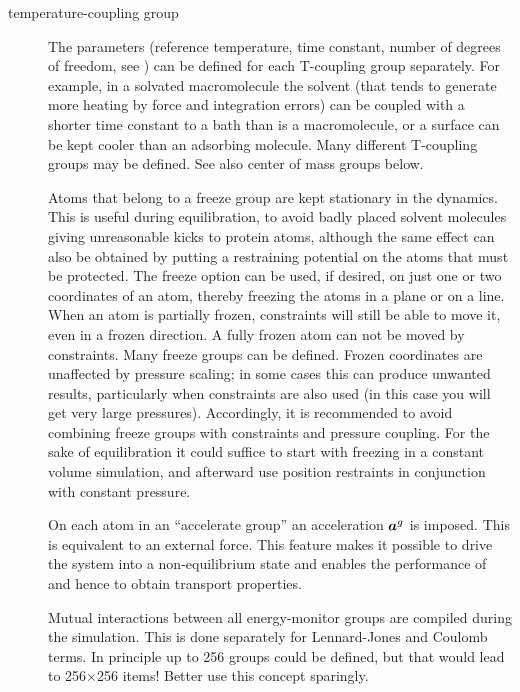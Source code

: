 \begin{description}
\item[temperature-coupling group ]
The  parameters (reference
temperature, time constant, number of degrees of freedom, see
) can be defined for each T-coupling group
separately. For example, in a solvated macromolecule the solvent (that
tends to generate more heating by force and integration errors) can be
coupled with a shorter time constant to a bath than is a macromolecule,
or a surface can be kept cooler than an adsorbing molecule. Many
different T-coupling groups may be defined. See also center of mass
groups below.

\item[]
Atoms that belong to a freeze group are kept stationary in the
dynamics. This is useful during equilibration, {\eg} to avoid badly
placed solvent molecules giving unreasonable kicks to protein atoms,
although the same effect can also be obtained by putting a restraining
potential on the atoms that must be protected. The freeze option can
be used, if desired, on just one or two coordinates of an atom,
thereby freezing the atoms in a plane or on a line.  When an atom is
partially frozen, constraints will still be able to move it, even in a
frozen direction. A fully frozen atom can not be moved by constraints.
Many freeze groups can be defined.  Frozen coordinates are unaffected
by pressure scaling; in some cases this can produce unwanted results,
particularly when constraints are also used (in this case you will
get very large pressures). Accordingly, it is recommended to avoid
combining freeze groups with constraints and pressure coupling. For the
sake of equilibration it could suffice to start with freezing in a
constant volume simulation, and afterward use position restraints in
conjunction with constant pressure.

\item[]
On each atom in an ``accelerate group'' an acceleration
$\mbox{\boldmath ${a}$}^g$ is imposed. This is equivalent to an external
force. This feature makes it possible to drive the system into a
non-equilibrium state and enables the performance of 
 and hence to obtain transport properties.

\item[]
Mutual interactions between all energy-monitor groups are compiled
during the simulation. This is done separately for Lennard-Jones and
Coulomb terms.  In principle up to 256 groups could be defined, but
that would lead to 256$\times$256 items! Better use this concept
sparingly.


\end{description}
